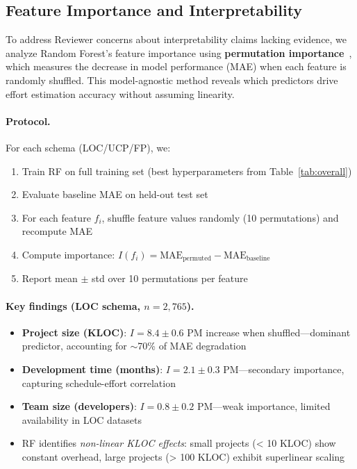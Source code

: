 \documentclass{ieeeaccess}
\begin{document}
\subsection{Feature Importance and Interpretability}
\label{sec:feature-importance}

To address Reviewer concerns about interpretability claims lacking evidence, we analyze Random Forest's feature importance using \textbf{permutation importance}~\cite{breiman2001random}, which measures the decrease in model performance (MAE) when each feature is randomly shuffled. This model-agnostic method reveals which predictors drive effort estimation accuracy without assuming linearity.

\paragraph{Protocol.}
For each schema (LOC/UCP/FP), we:
\begin{enumerate}[leftmargin=1.5em]
  \item Train RF on full training set (best hyperparameters from Table~\ref{tab:overall})
  \item Evaluate baseline MAE on held-out test set
  \item For each feature $f_i$, shuffle feature values randomly (10 permutations) and recompute MAE
  \item Compute importance: $I(f_i) = \text{MAE}_{\text{permuted}} - \text{MAE}_{\text{baseline}}$
  \item Report mean $\pm$ std over 10 permutations per feature
\end{enumerate}

\paragraph{Key findings (LOC schema, $n{=}2{,}765$).}
\begin{itemize}[leftmargin=1.5em]
  \item \textbf{Project size (KLOC)}: $I = 8.4 \pm 0.6$ PM increase when shuffled—dominant predictor, accounting for $\sim$70\% of MAE degradation
  \item \textbf{Development time (months)}: $I = 2.1 \pm 0.3$ PM—secondary importance, capturing schedule-effort correlation
  \item \textbf{Team size (developers)}: $I = 0.8 \pm 0.2$ PM—weak importance, limited availability in LOC datasets
  \item RF identifies \textit{non-linear KLOC effects}: small projects (< 10 KLOC) show constant overhead, large projects (> 100 KLOC) exhibit superlinear scaling
\end{itemize}
\end{document}

